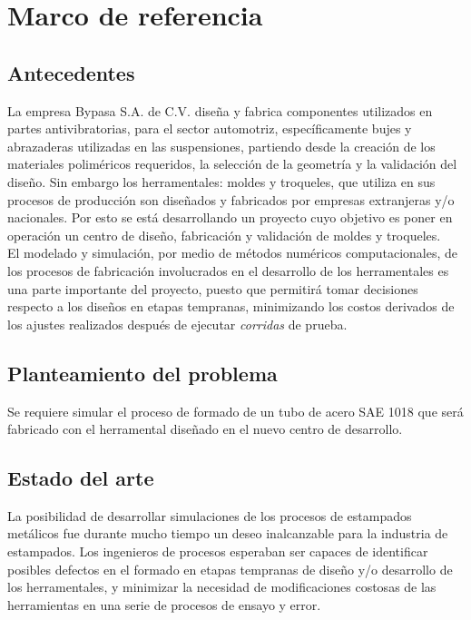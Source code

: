 \chapter{Marco de referencia}

\section{Antecedentes}

La empresa Bypasa S.A. de C.V. diseña y fabrica componentes utilizados en partes antivibratorias, para el sector 
automotriz, específicamente bujes y abrazaderas utilizadas en las suspensiones, 
partiendo desde la creación de los materiales poliméricos requeridos, la 
selección de la geometría y la validación del diseño. Sin embargo los herramentales: moldes y troqueles,  
que utiliza en sus procesos de producción son diseñados y fabricados por empresas extranjeras y/o 
nacionales. Por esto se está desarrollando un proyecto cuyo objetivo es poner en operación un centro 
de diseño, fabricación y validación de moldes y troqueles.\\

El modelado y simulación, por medio de métodos numéricos computacionales, de los procesos de fabricación 
involucrados en el desarrollo de los herramentales es una parte importante del proyecto, puesto que 
permitirá tomar decisiones respecto a los diseños en etapas tempranas, minimizando los costos derivados de 
los ajustes realizados después de ejecutar \textit{corridas} de prueba.

\section{Planteamiento del problema}

Se requiere simular el proceso de formado de un tubo de acero SAE 1018 que será fabricado con el herramental 
diseñado en el nuevo centro de desarrollo.

\section{Estado del arte}

La posibilidad de desarrollar simulaciones de los procesos de estampados metálicos fue durante mucho tiempo 
un deseo inalcanzable para la industria de estampados. Los ingenieros de procesos esperaban ser capaces de 
identificar posibles defectos en el formado en etapas tempranas de diseño y/o desarrollo de los herramentales, 
y minimizar la necesidad de modificaciones costosas de las herramientas en una serie de procesos de ensayo y error. \\

